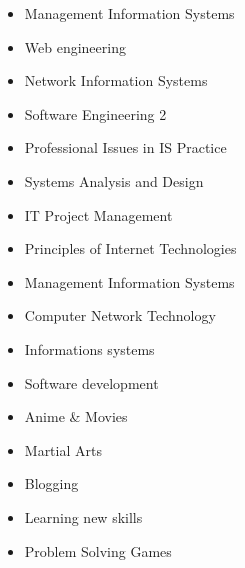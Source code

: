 \documentclass[10pt,a4paper,ragged2e,withhyper]{altacv}
\begin{document}
\begin{paracol}{2}
\switchcolumn

\newpage


\begin{itemize}[label=\textcolor{DarkPastelRed}{$\triangleright$}]
\item Management Information Systems
\item Web engineering
\item Network Information Systems
\item Software Engineering 2
\item Professional Issues in IS Practice
\item Systems Analysis and Design
\item IT Project Management
\item Principles of Internet Technologies
\item Management Information Systems
\item Computer Network Technology
\item Informations systems
\item Software development
\end{itemize}


\begin{multicols}{2}
\begin{itemize}[label=\textcolor{DarkPastelRed}{$\triangleright$}]
\item Anime \& Movies
\item Martial Arts
\item Blogging
\item Learning new skills
\item Problem Solving Games
\end{itemize}
\end{multicols}

\end{paracol}
\end{document}
